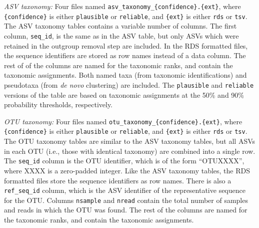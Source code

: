 \documentclass[
]{article}
\begin{document}
\emph{ASV taxonomy:} Four files named \texttt{asv\_taxonomy\_\{confidence\}.\{ext\}}, where \texttt{\{confidence\}} is either \texttt{plausible} or \texttt{reliable}, and \texttt{\{ext\}} is either \texttt{rds} or \texttt{tsv}.
The ASV taxonomy tables contains a variable number of columns.
The first column, \texttt{seq\_id}, is the same as in the ASV table, but only ASVs which were retained in the outgroup removal step are included.
In the RDS formatted files, the sequence identifiers are stored as row names instead of a data column.
The rest of of the columns are named for the taxonomic ranks, and contain the taxonomic assignments.
Both named taxa (from taxonomic identifications) and pseudotaxa (from \emph{de novo} clustering) are included.
The \texttt{plausible} and \texttt{reliable} versions of the table are based on taxonomic assignments at the 50\% and 90\% probability thresholds, respectively.

\emph{OTU taxonomy:} Four files named \texttt{otu\_taxonomy\_\{confidence\}.\{ext\}}, where \texttt{\{confidence\}} is either \texttt{plausible} or \texttt{reliable}, and \texttt{\{ext\}} is either \texttt{rds} or \texttt{tsv}.
The OTU taxonomy tables are similar to the ASV taxonomy tables, but all ASVs in each OTU (i.e., those with identical taxonomy) are combined into a single row.
The \texttt{seq\_id} column is the OTU identifier, which is of the form ``OTUXXXX'', where XXXX is a zero-padded integer.
Like the ASV taxonomy tables, the RDS formatted files store the sequence identifiers as row names.
There is also a \texttt{ref\_seq\_id} column, which is the ASV identifier of the representative sequence for the OTU.
Columns \texttt{nsample} and \texttt{nread} contain the total number of samples and reads in which the OTU was found.
The rest of the columns are named for the taxonomic ranks, and contain the taxonomic assignments.
\end{document}
